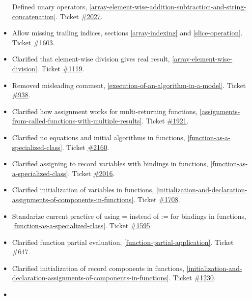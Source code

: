 \begin{itemize}
  Defined unary operators, \cref{array-element-wise-addition-subtraction-and-string-concatenation}. Ticket
  \href{https://github.com/modelica/ModelicaSpecification/issues/2027}{\#2027}.
\item
  Allow missing trailing indices, sections \cref{array-indexing} and \cref{slice-operation}. Ticket
  \href{https://github.com/modelica/ModelicaSpecification/issues/1603}{\#1603}.
\item
  Clarified that element-wise division gives real result,
  \cref{array-element-wise-division}. Ticket
  \href{https://github.com/modelica/ModelicaSpecification/issues/1119}{\#1119}.
\item
  Removed misleading comment, \cref{execution-of-an-algorithm-in-a-model}. Ticket
  \href{https://github.com/modelica/ModelicaSpecification/issues/938}{\#938}.
\item
  Clarified how assignment works for multi-returning functions,
  \cref{assignments-from-called-functions-with-multiple-results}. Ticket
  \href{https://github.com/modelica/ModelicaSpecification/issues/1921}{\#1921}.
\item
  Clarified no equations and initial algorithms in functions,
  \cref{function-as-a-specialized-class}. Ticket
  \href{https://github.com/modelica/ModelicaSpecification/issues/2160}{\#2160}.
\item
  Clarified assigning to record variables with bindings in functions,
  \cref{function-as-a-specialized-class}. Ticket
  \href{https://github.com/modelica/ModelicaSpecification/issues/2016}{\#2016}.
\item
  Clarified initialization of variables in functions, \cref{initialization-and-declaration-assignments-of-components-in-functions}.
  Ticket \href{https://github.com/modelica/ModelicaSpecification/issues/1708}{\#1708}.
\item
  Standarize current practice of using = instead of := for bindings in
  functions, \cref{function-as-a-specialized-class}. Ticket
  \href{https://github.com/modelica/ModelicaSpecification/issues/1595}{\#1595}.
\item
  Clarified function partial evaluation, \cref{function-partial-application}. Ticket
  \href{https://github.com/modelica/ModelicaSpecification/issues/647}{\#647}.
\item
  Clarified initialization of record components in functions,
  \cref{initialization-and-declaration-assignments-of-components-in-functions}. Ticket
  \href{https://github.com/modelica/ModelicaSpecification/issues/1230}{\#1230}.
\item

\end{itemize}
